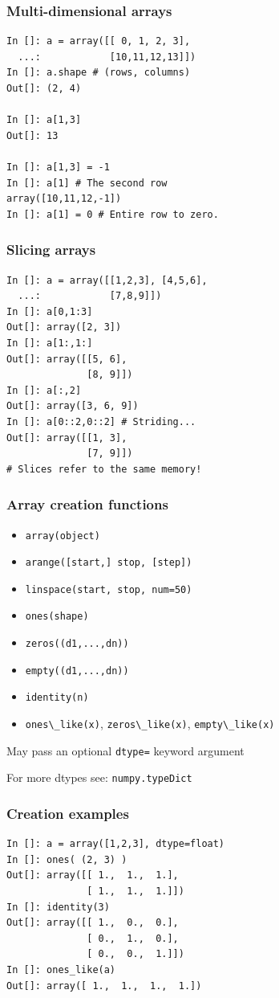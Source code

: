 \documentclass[14pt,compress]{beamer}
\newcommand{\typ}[1]{\lstinline{#1}}
\begin{document}
\begin{frame}[fragile]
  \frametitle{Multi-dimensional arrays}
\begin{lstlisting}
In []: a = array([[ 0, 1, 2, 3],
  ...:            [10,11,12,13]])
In []: a.shape # (rows, columns)
Out[]: (2, 4)

In []: a[1,3] 
Out[]: 13

In []: a[1,3] = -1
In []: a[1] # The second row
array([10,11,12,-1])
In []: a[1] = 0 # Entire row to zero.
\end{lstlisting}

\end{frame}

\begin{frame}[fragile]
  \frametitle{Slicing arrays}
  \vspace*{-0.2in}
\begin{lstlisting}
In []: a = array([[1,2,3], [4,5,6], 
  ...:            [7,8,9]])
In []: a[0,1:3]
Out[]: array([2, 3])
In []: a[1:,1:]
Out[]: array([[5, 6],
              [8, 9]])
In []: a[:,2]
Out[]: array([3, 6, 9])
In []: a[0::2,0::2] # Striding...
Out[]: array([[1, 3],
              [7, 9]])
# Slices refer to the same memory!
\end{lstlisting}
\end{frame}

\begin{frame}[fragile]
  \frametitle{Array creation functions}
  \begin{itemize}
  \item \typ{array(object)}
  \item \typ{arange([start,] stop, [step])}
  \item \typ{linspace(start, stop, num=50)}
  \item \typ{ones(shape)}
  \item \typ{zeros((d1,...,dn))}
  \item \typ{empty((d1,...,dn))}
  \item \typ{identity(n)}
  \item \typ{ones\_like(x)}, \typ{zeros\_like(x)}, \typ{empty\_like(x)}
  \end{itemize}
  May pass an optional \typ{dtype=} keyword argument

  For more dtypes see: \typ{numpy.typeDict}
\end{frame}

\begin{frame}[fragile]
  \frametitle{Creation examples}
  \vspace*{-0.25in}
\begin{lstlisting}
In []: a = array([1,2,3], dtype=float)
In []: ones( (2, 3) )
Out[]: array([[ 1.,  1.,  1.],
              [ 1.,  1.,  1.]])
In []: identity(3)
Out[]: array([[ 1.,  0.,  0.],
              [ 0.,  1.,  0.],
              [ 0.,  0.,  1.]])
In []: ones_like(a)
Out[]: array([ 1.,  1.,  1.,  1.])
\end{lstlisting}
\end{frame}
\end{document}
